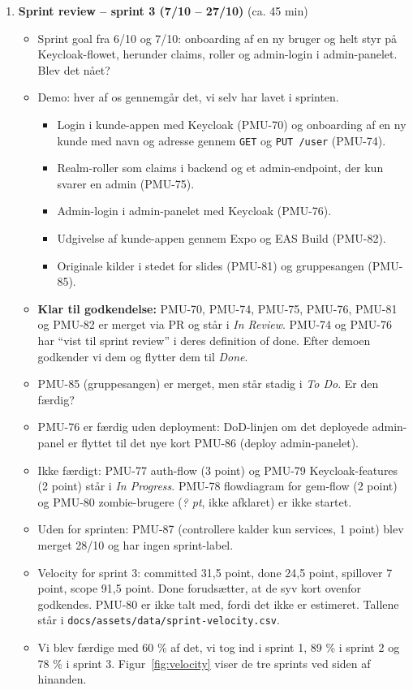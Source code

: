 \documentclass[a4paper,11pt]{article}
\begin{document}
\begin{enumerate}
    \item \textbf{Sprint review -- sprint 3 (7/10 -- 27/10)} (ca. 45 min)
    \begin{itemize}
        \item Sprint goal fra 6/10 og 7/10: onboarding af en ny bruger og helt styr på Keycloak-flowet, herunder claims, roller og admin-login i admin-panelet. Blev det nået?
        \item Demo: hver af os gennemgår det, vi selv har lavet i sprinten.
        \begin{itemize}
            \item Login i kunde-appen med Keycloak (PMU-70) og onboarding af en ny kunde med navn og adresse gennem \texttt{GET} og \texttt{PUT /user} (PMU-74).
            \item Realm-roller som claims i backend og et admin-endpoint, der kun svarer en admin (PMU-75).
            \item Admin-login i admin-panelet med Keycloak (PMU-76).
            \item Udgivelse af kunde-appen gennem Expo og EAS Build (PMU-82).
            \item Originale kilder i stedet for slides (PMU-81) og gruppesangen (PMU-85).
        \end{itemize}
        \item \textbf{Klar til godkendelse:} PMU-70, PMU-74, PMU-75, PMU-76, PMU-81 og PMU-82 er merget via PR og står i \emph{In Review}. PMU-74 og PMU-76 har ``vist til sprint review'' i deres definition of done. Efter demoen godkender vi dem og flytter dem til \emph{Done}.
        \item PMU-85 (gruppesangen) er merget, men står stadig i \emph{To Do}. Er den færdig?
        \item PMU-76 er færdig uden deployment: DoD-linjen om det deployede admin-panel er flyttet til det nye kort PMU-86 (deploy admin-panelet).
        \item Ikke færdigt: PMU-77 auth-flow (3 point) og PMU-79 Keycloak-features (2 point) står i \emph{In Progress}. PMU-78 flowdiagram for gem-flow (2 point) og PMU-80 zombie-brugere (\emph{? pt}, ikke afklaret) er ikke startet.
        \item Uden for sprinten: PMU-87 (controllere kalder kun services, 1 point) blev merget 28/10 og har ingen sprint-label.
        \item Velocity for sprint 3: committed 31,5 point, done 24,5 point, spillover 7 point, scope 91,5 point. Done forudsætter, at de syv kort ovenfor godkendes. PMU-80 er ikke talt med, fordi det ikke er estimeret. Tallene står i \texttt{docs/assets/data/sprint-velocity.csv}.
        \item Vi blev færdige med 60 \% af det, vi tog ind i sprint 1, 89 \% i sprint 2 og 78 \% i sprint 3. Figur~\ref{fig:velocity} viser de tre sprints ved siden af hinanden.
    \end{itemize}


\end{enumerate}
\end{document}
